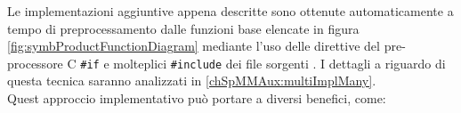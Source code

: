 Le implementazioni aggiuntive appena descritte sono ottenute automaticamente 
a tempo di preprocessamento dalle funzioni base elencate in figura \ref{fig:symbProductFunctionDiagram}
mediante l'uso delle direttive del pre-processore C \verb|#if| e molteplici \verb|#include| dei file sorgenti \cite{cpp11.2}.
I dettagli a riguardo di questa tecnica saranno analizzati in \ref{chSpMMAux:multiImplMany}.\\
\label{chSpMMSymb:funcsMultiImpleVSmanualMultiFunc}
Quest approccio implementativo può portare a diversi benefici, come:
